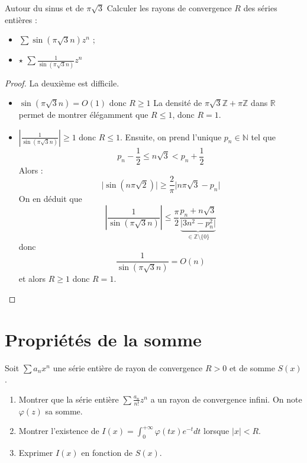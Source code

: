 \documentclass[french,a4paper]{article}
\newcommand{\N}{\mathbb{N}}
\newcommand{\Z}{\mathbb{Z}}
\newcommand{\R}{\mathbb{R}}
\theoremstyle{plain}
\theoremstyle{definition}
\theoremstyle{remark}
\begin{document}
\begin{ex}[Moulin.SE.09]{Autour du sinus et de $\pi\sqrt{3}$}
	Calculer les rayons de convergence $R$ des séries entières :
	\begin{itemize}
		\item $\displaystyle\sum \sin(\pi\sqrt{3}n)z^n$ ;
		\item $\star$ $\displaystyle\sum \frac{1}{\sin(\pi\sqrt{3}n)}z^n$
	\end{itemize}
\end{ex}
\begin{proof}
	La deuxième est difficile.
	\begin{itemize}
		\item $\sin(\pi\sqrt{3}n)=O(1)$ donc $R\geqslant1$ La densité de $\pi\sqrt{3}\Z+\pi\Z$ dans $\R$ permet de montrer élégamment que $R\leqslant 1$, donc $R=1$.
		\item $\displaystyle\left\lvert\frac{1}{\sin(\pi\sqrt{3}n)}\right\rvert\geqslant 1$ donc $R\leqslant 1$. Ensuite, on prend l'unique $p_n\in\N$ tel que $$p_n-\frac{1}{2}\leqslant n\sqrt{3}<p_n+\frac12$$ Alors : $$\lvert\sin(n\pi\sqrt{2})\rvert\geqslant\frac{2}{\pi}\lvert n\pi\sqrt{3}-p_n\rvert$$ On en déduit que $$\left\lvert\frac{1}{\sin(\pi\sqrt{3}n)}\right\rvert\leqslant\frac{\pi}{2}\frac{p_n+n\sqrt{3}}{\underbrace{\lvert 3n^2-p_n^2\rvert}_{\in\Z\setminus\{0\}}}$$ donc $$\frac{1}{\sin(\pi\sqrt{3}n)}=O(n)$$ et alors $R\geqslant 1$ donc $R=1$.
	\end{itemize}
\end{proof}

\section{Propriétés de la somme}

\begin{ex}[Moulin.SE.10]{}
	Soit $\displaystyle\sum a_nx^n$ une série entière de rayon de convergence $R>0$ et de somme $S(x)$.
	\begin{enumerate}
		\item Montrer que la série entière $\displaystyle\sum\frac{a_n}{n!}z^n$ a un rayon de convergence infini. On note $\varphi(z)$ sa somme.
		\item Montrer l'existence de $I(x)=\displaystyle\int_{0}^{+\infty}\varphi(tx)e^{-t}dt$ lorsque $\lvert x\rvert<R$.
		\item Exprimer $I(x)$ en fonction de $S(x)$.
	\end{enumerate}
\end{ex}
\end{document}
